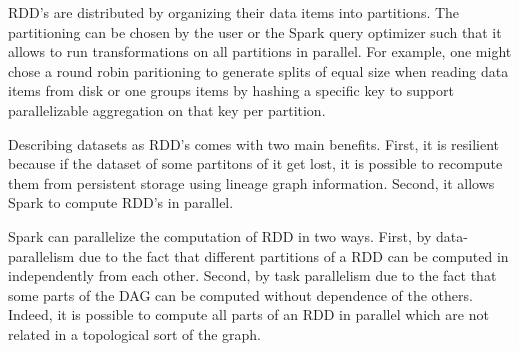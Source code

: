 RDD's are distributed by organizing their data items into partitions.
The partitioning can be chosen by the user or the Spark query optimizer such that it allows to run transformations on all partitions
in parallel.
For example, one might chose a round robin paritioning to generate splits of equal size when reading data items from disk or one
groups items by hashing a specific key to support parallelizable aggregation on that key per partition.

Describing datasets as RDD's comes with two main benefits.
First, it is resilient because if the dataset of some partitons of it get lost, it is possible to recompute them from persistent storage
using lineage graph information.
Second, it allows Spark to compute RDD's in parallel.

Spark can parallelize the computation of RDD in two ways.
First, by data-parallelism due to the fact that different partitions of a RDD can
be computed in independently from each other.
Second, by task parallelism due to the fact that some parts of the DAG can be computed without dependence of the others.
Indeed, it is possible to compute all parts of an RDD in parallel which are not related in a topological sort of the graph.

%







